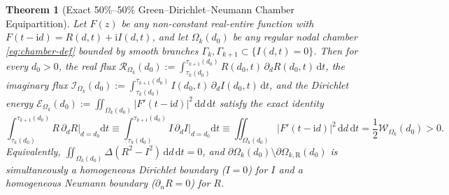 \documentclass[11pt,reqno]{amsart}
\newtheorem{theorem}{Theorem}[section]
\theoremstyle{definition}
\theoremstyle{remark}
\numberwithin{equation}{section}
\newcommand{\dd}{\mathrm{d}}
\newcommand{\ii}{\mathrm{i}}
\begin{document}
\begin{theorem}[Exact 50\%--50\% Green--Dirichlet--Neumann Chamber Equipartition]\label{thm:green-equipartition}
Let $F(z)$ be any non-constant real-entire function with $F(t-\ii d)=R(d,t)+\ii I(d,t)$, and let $\Omega_k(d_0)$ be any regular nodal chamber \eqref{eq:chamber-def} bounded by smooth branches $\Gamma_k,\Gamma_{k+1} \subset \{I(d,t)=0\}$. Then for every $d_0 > 0$, the real flux $\mathcal{R}_{\Omega_k}(d_0) := \int_{\tau_k(d_0)}^{\tau_{k+1}(d_0)} R(d_0,t)\,\partial_d R(d_0,t)\,\dd t$, the imaginary flux $\mathcal{I}_{\Omega_k}(d_0) := \int_{\tau_k(d_0)}^{\tau_{k+1}(d_0)} I(d_0,t)\,\partial_d I(d_0,t)\,\dd t$, and the Dirichlet energy $\mathcal{E}_{\Omega_k}(d_0) := \iint_{\Omega_k(d_0)} |F'(t-\ii d)|^2\,\dd d\,\dd t$ satisfy the exact identity
\begin{equation}\label{eq:boxed-green-equipartition}
\boxed{\int_{\tau_k(d_0)}^{\tau_{k+1}(d_0)} R\,\partial_d R\Big|_{d=d_0}\dd t \equiv \int_{\tau_k(d_0)}^{\tau_{k+1}(d_0)} I\,\partial_d I\Big|_{d=d_0}\dd t \equiv \iint_{\Omega_k(d_0)} \bigl|F'(t - \ii d)\bigr|^2\,\dd d\,\dd t = \frac{1}{2}\mathcal{W}_{\Omega_k}(d_0) > 0.}
\end{equation}
Equivalently, $\iint_{\Omega_k(d_0)} \Delta(R^2 - I^2)\,\dd d\,\dd t = 0$, and $\partial\Omega_k(d_0) \setminus \partial\Omega_{k,\mathrm{R}}(d_0)$ is simultaneously a homogeneous Dirichlet boundary ($I=0$) for $I$ and a homogeneous Neumann boundary ($\partial_n R = 0$) for $R$.
\end{theorem}
\end{document}
